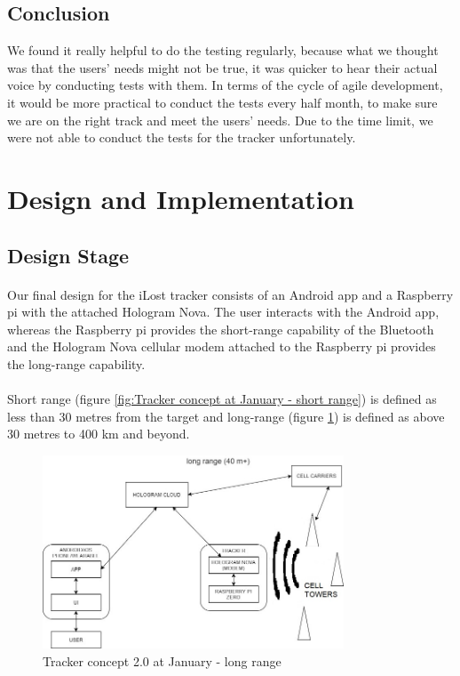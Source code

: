 \documentclass[12pt,a4paper]{article}
\begin{document}
        \subsection{Conclusion}
          We found it really helpful to do the testing regularly, because what we thought was that the users' needs might not be true, it was quicker to hear their actual voice by conducting tests with them. In terms of the cycle of agile development, it would be more practical to conduct the tests every half month, to make sure we are on the right track and meet the users' needs.           
          Due to the time limit, we were not able to conduct the tests for the tracker unfortunately.
      
    \section{Design and Implementation}
      \subsection{Design Stage}
        \paragraph{} Our final design for the iLost tracker consists of an Android app and a Raspberry pi with the attached Hologram Nova. The user interacts with the Android app, whereas the Raspberry pi provides the short-range capability of the Bluetooth and the Hologram Nova cellular modem attached to the Raspberry pi provides the long-range capability.

        \paragraph{} Short range (figure \ref{fig:Tracker concept at January - short range}) is defined as less than 30 metres from the target and long-range (figure \ref{fig:Tracker concept at January - long range}) is defined as above 30 metres to 400 km and beyond.
        
        \begin{figure}[H]
          \centering
          \includegraphics[width=0.8\textwidth]{../assets/design-concept-v20-long-range.jpg}
          \caption{Tracker concept 2.0 at January - long range}
          \label{fig:Tracker concept at January - long range}
        \end{figure}
        
\end{document}
